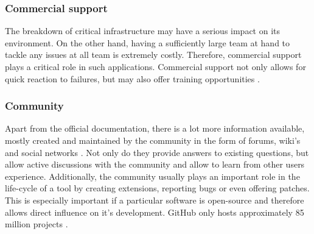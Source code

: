 \subsubsection{Commercial support}

The breakdown of critical infrastructure may have a serious impact on its environment. On the other hand, having a sufficiently large team at hand to tackle any issues at all team is extremely costly. Therefore, commercial support plays a critical role in such applications. Commercial support not only allows for quick reaction to failures, but may also offer training opportunities \cite{delaet2010survey}.


\subsubsection{Community}

Apart from the official documentation, there is a lot more information available, mostly created and maintained by the community in the form of forums, wiki's and social networks \cite{delaet2010survey}. Not only do they provide answers to existing questions, but allow active discussions with the community and allow to learn from other users experience. Additionally, the community usually plays an important role in the life-cycle of a tool by creating extensions, reporting bugs or even offering patches. This is especially important if a particular software is open-source and therefore allows direct influence on it's development. GitHub only hosts approximately 85 million projects \cite{githubabout}.

